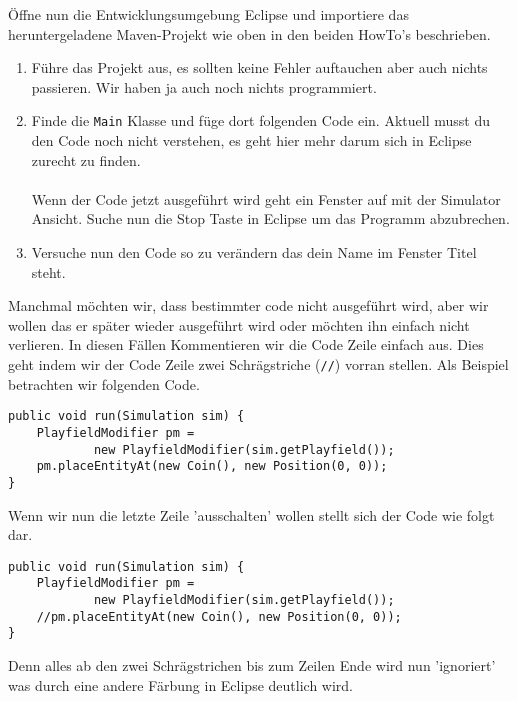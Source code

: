 \newpage

Öffne nun die Entwicklungsumgebung Eclipse und importiere das heruntergeladene Maven-Projekt \jvkpackage wie oben in den beiden HowTo's beschrieben.

\begin{enumerate}[label=\alph*)]
    \item Führe das Projekt aus, es sollten keine Fehler auftauchen aber auch nichts passieren. Wir haben ja auch noch nichts programmiert.
    \item Finde die \texttt{Main} Klasse und füge dort folgenden Code ein. Aktuell musst du den Code noch nicht verstehen, es geht hier mehr darum sich in Eclipse zurecht zu finden.\\
    \\
    Wenn der Code jetzt ausgeführt wird geht ein Fenster auf mit der Simulator Ansicht. Suche nun die Stop Taste in Eclipse um das Programm abzubrechen.
    \item Versuche nun den Code so zu verändern das dein Name im Fenster Titel steht.
\end{enumerate}

\begin{Infobox}
    Manchmal möchten wir, dass bestimmter code nicht ausgeführt wird, aber wir wollen das er später wieder ausgeführt wird oder möchten ihn einfach nicht verlieren.
    In diesen Fällen Kommentieren wir die Code Zeile einfach aus.
    Dies geht indem wir der Code Zeile zwei Schrägstriche ({\color{javagreen}\texttt{//}}) vorran stellen.
    Als Beispiel betrachten wir folgenden Code.

    \begin{lstlisting}
public void run(Simulation sim) {
    PlayfieldModifier pm =
            new PlayfieldModifier(sim.getPlayfield());
    pm.placeEntityAt(new Coin(), new Position(0, 0));
}
    \end{lstlisting}

    Wenn wir nun die letzte Zeile 'ausschalten' wollen stellt sich der Code wie folgt dar.

    \begin{lstlisting}
public void run(Simulation sim) {
    PlayfieldModifier pm =
            new PlayfieldModifier(sim.getPlayfield());
    //pm.placeEntityAt(new Coin(), new Position(0, 0));
}
    \end{lstlisting}

    Denn alles ab den zwei Schrägstrichen bis zum Zeilen Ende wird nun 'ignoriert' was durch eine andere Färbung in Eclipse deutlich wird.
\end{Infobox}

